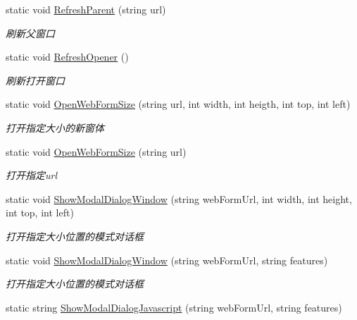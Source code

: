 \begin{DoxyCompactItemize}
static void \hyperlink{class_x_c_l_net_tools_1_1_javascript_1_1_jscript_a6f2c5e702c2381bd77f86463693340cb}{Refresh\-Parent} (string url)
\begin{DoxyCompactList}\small\item\em 刷新父窗口 \end{DoxyCompactList}\item 
static void \hyperlink{class_x_c_l_net_tools_1_1_javascript_1_1_jscript_ad0de2aa10ba5437ea797513703b50e64}{Refresh\-Opener} ()
\begin{DoxyCompactList}\small\item\em 刷新打开窗口 \end{DoxyCompactList}\item 
static void \hyperlink{class_x_c_l_net_tools_1_1_javascript_1_1_jscript_ab16b9ee41a91197d9517ecfb6920c2a5}{Open\-Web\-Form\-Size} (string url, int width, int heigth, int top, int left)
\begin{DoxyCompactList}\small\item\em 打开指定大小的新窗体 \end{DoxyCompactList}\item 
static void \hyperlink{class_x_c_l_net_tools_1_1_javascript_1_1_jscript_aba38ab9b4225ae46f2a2b043ae90cbfd}{Open\-Web\-Form\-Size} (string url)
\begin{DoxyCompactList}\small\item\em 打开指定url \end{DoxyCompactList}\item 
static void \hyperlink{class_x_c_l_net_tools_1_1_javascript_1_1_jscript_a2a6b3bcc01894290fbbf4835a328d396}{Show\-Modal\-Dialog\-Window} (string web\-Form\-Url, int width, int height, int top, int left)
\begin{DoxyCompactList}\small\item\em 打开指定大小位置的模式对话框 \end{DoxyCompactList}\item 
static void \hyperlink{class_x_c_l_net_tools_1_1_javascript_1_1_jscript_a793a61a17a63b03dca9adb8f0523f5bf}{Show\-Modal\-Dialog\-Window} (string web\-Form\-Url, string features)
\begin{DoxyCompactList}\small\item\em 打开指定大小位置的模式对话框 \end{DoxyCompactList}\item 
static string \hyperlink{class_x_c_l_net_tools_1_1_javascript_1_1_jscript_a9171e2ec7c8e1f0092c0ec0ef2618096}{Show\-Modal\-Dialog\-Javascript} (string web\-Form\-Url, string features)

\end{DoxyCompactItemize}
